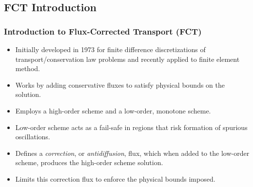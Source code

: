 \documentclass{beamer} \useoutertheme{infolines}
\begin{document}
\subsection{FCT Introduction}
\begin{frame}
\frametitle{Introduction to Flux-Corrected Transport (FCT)}

\begin{itemize}
   \item Initially developed in 1973 for finite difference discretizations of
      transport/conservation law problems and recently applied to finite element
      method.
   \item Works by adding conservative fluxes to satisfy physical bounds on the
      solution.
   \item Employs a high-order scheme and a low-order, monotone scheme.
   \item Low-order scheme acts as a fail-safe in regions that risk formation
     of spurious oscillations.
   \item Defines a \emph{correction}, or \emph{antidiffusion}, flux, which
      when added to the low-order scheme, produces the high-order scheme
      solution.
   \item Limits this correction flux to enforce the physical bounds imposed.
\end{itemize}

\end{frame}
\end{document}

